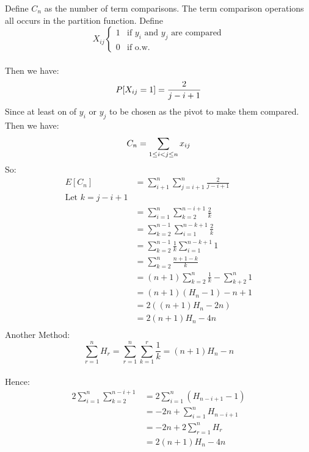 \documentclass{article}
\newcommand{\twopartdef}[4]
{
  \left\{
  \begin{array}{ll}
    #1 & \mbox{if } #2 \\
    #3 & \mbox{if } #4
  \end{array}
  \right.
}
\begin{document}
Define $C_n$ as the number of term comparisons. The term comparison
operations all occurs in the partition function. Define\\
\[
X_{ij}\twopartdef{1}{\text{$y_i$ and $y_j$ are compared}}{0}{\text{o.w.}}
\]
\\
Then we have:\\
\[
P[X_{ij}=1]=\frac{2}{j-i+1}\\
\]
Since at least on of $y_i$ or $y_j$ to be chosen as the pivot to make
them compared.\\ 
Then we have:\\
\[
C_n=\sum_{1\leq i<j\leq n}x_{ij}\\
\]
So:\\
\begin{align*}
E[C_n]&=\sum_{i+1}^n\sum_{j=i+1}^n\frac{2}{j-i+1}\\
\text{Let $k=j-i+1$}\\
&=\sum_{i=1}^n\sum_{k=2}^{n-i+1}\frac{2}{k}\\
&=\sum_{k=2}^{n-1}\sum_{i=1}^{n-k+1}\frac{2}{k}\\
&=\sum_{k=2}^{n-1}\frac{1}{k}\sum_{i=1}^{n-k+1}1\\
&=\sum_{k=2}^n\frac{n+1-k}{k}\\
&=(n+1)\sum_{k=2}^n\frac{1}{k}-\sum_{k+2}^n1\\
&=(n+1)(H_n-1)-n+1\\
&=2((n+1)H_n-2n)\\
&=2(n+1)H_n-4n\\
\end{align*}
Another Method:\\
\[\sum_{r=1}^nH_r=\sum_{r=1}^n\sum_{k=1}^r\frac{1}{k}=(n+1)H_n-n\]\\
Hence:\\
\begin{align*}
2\sum_{i=1}^n\sum_{k=2}^{n-i+1}&=2\sum_{i=1}^n(H_{n-i+1}-1)\\
&=-2n+\sum_{i=1}^nH_{n-i+1}\\
&=-2n+2\sum_{r=1}^nH_r\\
&=2(n+1)H_n-4n\\
\end{align*}
\end{document}
